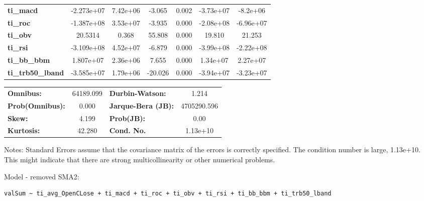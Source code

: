 \begin{center}
\begin{tabular}{lcccccc}
\textbf{ti\_macd}           &   -2.273e+07  &     7.42e+06     &    -3.065  &         0.002        &    -3.73e+07    &     -8.2e+06     \\
\textbf{ti\_roc}            &   -1.387e+08  &     3.53e+07     &    -3.935  &         0.000        &    -2.08e+08    &    -6.96e+07     \\
\textbf{ti\_obv}            &      20.5314  &        0.368     &    55.808  &         0.000        &       19.810    &       21.253     \\
\textbf{ti\_rsi}            &   -3.109e+08  &     4.52e+07     &    -6.879  &         0.000        &    -3.99e+08    &    -2.22e+08     \\
\textbf{ti\_bb\_bbm}        &    1.807e+07  &     2.36e+06     &     7.655  &         0.000        &     1.34e+07    &     2.27e+07     \\
\textbf{ti\_trb50\_lband}   &   -3.585e+07  &     1.79e+06     &   -20.026  &         0.000        &    -3.94e+07    &    -3.23e+07     \\
\bottomrule
\end{tabular}
\begin{tabular}{lclc}
\textbf{Omnibus:}       & 64189.099 & \textbf{  Durbin-Watson:     } &      1.214   \\
\textbf{Prob(Omnibus):} &    0.000  & \textbf{  Jarque-Bera (JB):  } & 4705290.596  \\
\textbf{Skew:}          &    4.199  & \textbf{  Prob(JB):          } &       0.00   \\
\textbf{Kurtosis:}      &   42.280  & \textbf{  Cond. No.          } &   1.13e+10   \\
\bottomrule
\end{tabular}
\end{center}

Notes: \newline
 [1] Standard Errors assume that the covariance matrix of the errors is correctly specified. \newline
 [2] The condition number is large, 1.13e+10. This might indicate that there are \newline
 strong multicollinearity or other numerical problems.

Model - removed SMA2: \begin{verbatim}valSum ~ ti_avg_OpenCLose + ti_macd + ti_roc + ti_obv + ti_rsi + ti_bb_bbm + ti_trb50_lband\end{verbatim}

